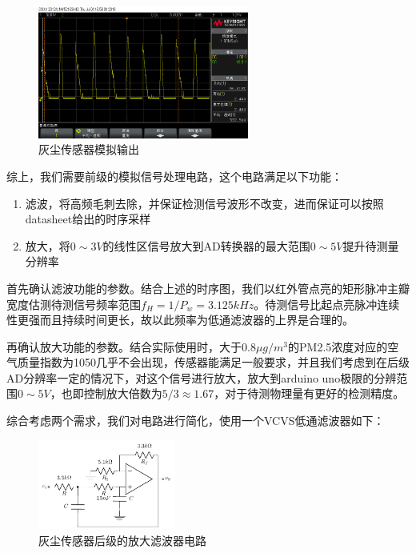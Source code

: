 \documentclass[a4paper, 11pt]{article} %
\begin{document}
\begin{figure}[H]
  \centering
  \includegraphics[width = 0.618\textwidth]{GP2Y_before_filter.png}
  \caption{灰尘传感器模拟输出}
  \label{fig:GP2Y_raw_output}
\end{figure}

综上，我们需要前级的模拟信号处理电路，这个电路满足以下功能：

\begin{enumerate}
  \item 滤波，将高频毛刺去除，并保证检测信号波形不改变，进而保证可以按照datasheet给出的时序采样
  \item 放大，将$0 \sim 3V$的线性区信号放大到AD转换器的最大范围$0 \sim 5V$提升待测量分辨率
\end{enumerate}

首先确认滤波功能的参数。结合上述的时序图，我们以红外管点亮的矩形脉冲主瓣宽度估测待测信号频率范围$f_H = 1 / P_w = 3.125kHz$。待测信号比起点亮脉冲连续性更强而且持续时间更长，故以此频率为低通滤波器的上界是合理的。

再确认放大功能的参数。结合实际使用时，大于$0.8\mu g/m^3$的PM2.5浓度对应的空气质量指数为1050几乎不会出现，传感器能满足一般要求，并且我们考虑到在后级AD分辨率一定的情况下，对这个信号进行放大，放大到arduino uno极限的分辨范围$0 \sim 5V$，也即控制放大倍数为$5 / 3 \approx 1.67$，对于待测物理量有更好的检测精度。

综合考虑两个需求，我们对电路进行简化，使用一个VCVS低通滤波器如下：

\begin{figure}[H]
  \centering
  \includegraphics[width = 0.4\textwidth]{vcvs.pdf}
  \caption{灰尘传感器后级的放大滤波器电路}
\end{figure}
\end{document}
